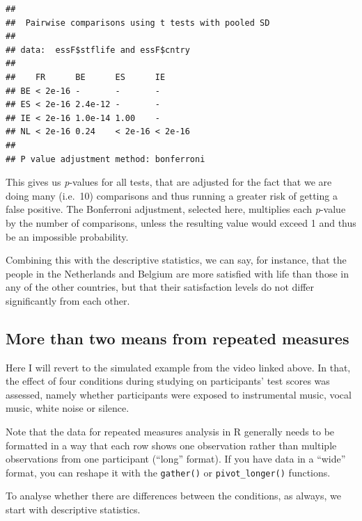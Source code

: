 \documentclass[
]{book}
\newenvironment{Shaded}{\begin{snugshade}}{\end{snugshade}}
\newcommand{\KeywordTok}[1]{\textcolor[rgb]{0.13,0.29,0.53}{\textbf{#1}}}
\newcommand{\NormalTok}[1]{#1}
\newcommand{\OperatorTok}[1]{\textcolor[rgb]{0.81,0.36,0.00}{\textbf{#1}}}
\newcommand{\StringTok}[1]{\textcolor[rgb]{0.31,0.60,0.02}{#1}}
\begin{document}
\begin{verbatim}
## 
## 	Pairwise comparisons using t tests with pooled SD 
## 
## data:  essF$stflife and essF$cntry 
## 
##    FR      BE      ES      IE     
## BE < 2e-16 -       -       -      
## ES < 2e-16 2.4e-12 -       -      
## IE < 2e-16 1.0e-14 1.00    -      
## NL < 2e-16 0.24    < 2e-16 < 2e-16
## 
## P value adjustment method: bonferroni
\end{verbatim}

This gives us \emph{p}-values for all tests, that are adjusted for the fact that we are doing many (i.e.~10) comparisons and thus running a greater risk of getting a false positive. The Bonferroni adjustment, selected here, multiplies each \emph{p}-value by the number of comparisons, unless the resulting value would exceed 1 and thus be an impossible probability.

Combining this with the descriptive statistics, we can say, for instance, that the people in the Netherlands and Belgium are more satisfied with life than those in any of the other countries, but that their satisfaction levels do not differ significantly from each other.

\hypertarget{more-than-two-means-from-repeated-measures}{%
\subsection{More than two means from repeated measures}\label{more-than-two-means-from-repeated-measures}}

Here I will revert to the simulated example from the video linked above. In that, the effect of four conditions during studying on participants' test scores was assessed, namely whether participants were exposed to instrumental music, vocal music, white noise or silence.

Note that the data for repeated measures analysis in R generally needs to be formatted in a way that each row shows one observation rather than multiple observations from one participant (``long'' format). If you have data in a ``wide'' format, you can reshape it with the \texttt{gather()} or \texttt{pivot\_longer()} functions.

To analyse whether there are differences between the conditions, as always, we start with descriptive statistics.

\begin{Shaded}
\end{Shaded}
\end{document}
